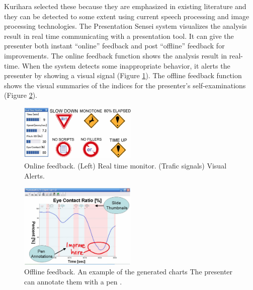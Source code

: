 \par Kurihara selected these because they are emphasized in existing literature and they can be detected to some extent using current speech processing and image processing technologies. The Presentation Sensei system visualizes the analysis result in real time communicating with a presentation tool. It can give the presenter both instant “online” feedback and post “offline” feedback for improvements. The online feedback function shows the analysis result in real-time. When the system detects some inappropriate behavior, it alerts the presenter by showing a visual signal (Figure \ref{fig:onlinefeedback}). The offline feedback function shows the visual summaries of the indices for the presenter’s self-examinations (Figure \ref{fig:offlinefeedback}).

\begin{figure}[htbp]
  \centering\includegraphics[width=0.5\textwidth]{./img/onlinefeedback.png}
  \caption[Online feedback of presentation sensei]{Online feedback. (Left) Real time monitor. (Trafic signals) Visual Alerts.\cite{Kurihara2007}}\label{fig:onlinefeedback}
\end{figure}

\begin{figure}[htbp]
  \centering\includegraphics[width=0.5\textwidth]{./img/offlinefeedback.png}
  \caption[Offline feedback of presentation sensei]{Offline feedback. An example of the generated charts The presenter can annotate them with a pen \cite{Kurihara2007}.}\label{fig:offlinefeedback}
\end{figure}


